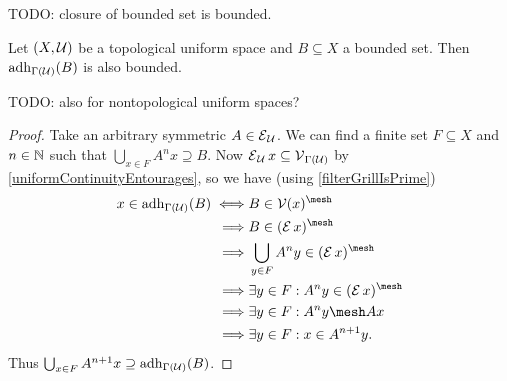 TODO: closure of bounded set is bounded.
\begin{proposition} \label{adherenceBoundedSet}
Let $\sSet{X, \mathcal{U}}$ be a topological uniform space and $B\subseteq X$ a bounded set. Then $\operatorname{adh}_{\Gamma(\mathcal{U})}(B)$ is also bounded.
\end{proposition}
TODO: also for nontopological uniform spaces?
\begin{proof}
Take an arbitrary symmetric $A\in \operatorname{\mathcal{E}}_\mathcal{U}$. We can find a finite set $F\subseteq X$ and $n\in \mathbb{N}$ such that $\bigcup_{x\in F}A^nx \supseteq B$. Now $\operatorname{\mathcal{E}}_\mathcal{U}x \subseteq \operatorname{\mathcal{V}}_{\Gamma(\mathcal{U})}$ by \ref{uniformContinuityEntourages}, so we have (using \ref{filterGrillIsPrime})
\begin{align*}
x\in \adh_{\Gamma(\mathcal{U})}(B) \iff& B\in \vicinity(x)^\mesh \\
\implies& B \in (\entourage x)^\mesh \\
\implies& \bigcup_{y\in F}A^ny \in (\entourage x)^\mesh \\
\implies& \exists y\in F: A^ny \in (\entourage x)^\mesh \\
\implies& \exists y\in F: A^ny \mesh Ax \\
\implies& \exists y\in F: x\in A^{n+1}y.
\end{align*}
Thus $\bigcup_{x\in F}A^{n+1}x \supseteq \operatorname{adh}_{\Gamma(\mathcal{U})}(B)$.
\end{proof}

